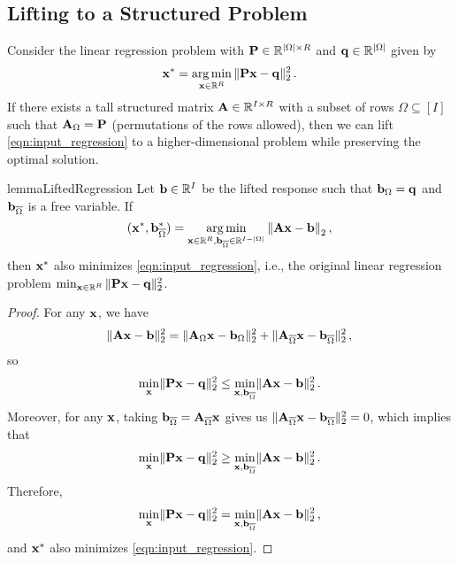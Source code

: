 \subsection{Lifting to a Structured Problem}
\label{ssec:lifting}
Consider the linear regression problem with $\mathbf{P}\in\mathbb{R}^{|\Omega| \times R}$ and $\mathbf{q} \in \mathbb{R}^{|\Omega|}$ given by
\begin{equation}
\label{eqn:input_regression}
    \mathbf{x}^* = \operatorname*{arg\,min}_{\mathbf{x} \in \mathbb{R}^R} \,\lVert\mathbf{P} \mathbf{x} - \mathbf{q}\rVert_{2}^2\,.
\end{equation}
If there exists a tall structured matrix $\mathbf{A} \in \mathbb{R}^{I \times R}$
with a subset of rows $\Omega \subseteq [I]$ such that $\mathbf{A}_{\Omega} = \mathbf{P}$
(permutations of the rows allowed),
then we can lift \eqref{eqn:input_regression} to a higher-dimensional problem while preserving the optimal solution.

\begin{restatable}[]{lemma}{LiftedRegression}
\label{lem:lifted_regression}
Let $\mathbf{b} \in \mathbb{R}^I$ be the lifted response such that $\mathbf{b}_{\Omega} = \mathbf{q}$
and $\mathbf{b}_{\overline{\Omega}}$ is a free variable. If
\begin{equation}
\label{eqn:lifted_regression}
    (\mat{x}^*, \mat{b}^*_{\overline{\Omega}})
    =
    \argmin_{\mat{x} \in \R^R, \mat{b}_{\overline{\Omega}} \in \R^{I - |\Omega|}}\, \norm*{\mat{A} \mat{x} - \mat{b}}_{2}\,,
\end{equation}
then $\mathbf{x}^*$ also minimizes \eqref{eqn:input_regression},
i.e., the original linear regression problem $\min_{\mathbf{x} \in \mathbb{R}^R}\, \lVert\mathbf{P} \mathbf{x} - \mathbf{q}\rVert_{2}^2$.
\end{restatable}

\begin{proof}
For any $\mathbf{x}$, we have
\[
    \lVert\mathbf{A}\mathbf{x}-\mathbf{b}\rVert_2^2
    =
    \lVert\mathbf{A}_{\Omega}\mathbf{x} - \mathbf{b}_{\Omega}\rVert_{2}^2
    +
    \lVert\mathbf{A}_{\overline\Omega}\mathbf{x} - \mathbf{b}_{\overline\Omega}\rVert_{2}^2\,,
\]
so
\[
\min_{\mathbf{x}}\lVert\mathbf{P} \mathbf{x} - \mathbf{q}\rVert_2^2 \leq \min_{\mathbf{x},\mathbf{b}_{\overline{\Omega}}} \lVert\mathbf{A}\mathbf{x}-\mathbf{b}\rVert_2^2\,.
\]
Moreover, for any $\mathbf{x}$, taking $\mathbf{b}_{\overline \Omega} = \mathbf{A}_{\overline \Omega}\mathbf{x}$ gives us $\lVert\mathbf{A}_{\overline\Omega}\mathbf{x} - \mathbf{b}_{\overline\Omega}\rVert_{2}^2=0$, which implies that
\[
\min_{\mathbf{x}} \lVert\mathbf{P} \mathbf{x} - \mathbf{q}\rVert_2^2 \geq \min_{\mathbf{x},\mathbf{b}_{\overline{\Omega}}} \lVert\mathbf{A}\mathbf{x}-\mathbf{b}\rVert_2^2\,.
\]
Therefore,
\[
\min_{\mathbf{x}}\lVert\mathbf{P} \mathbf{x} - \mathbf{q}\rVert_2^2 = \min_{\mathbf{x},\mathbf{b}_{\overline{\Omega}}} \lVert\mathbf{A}\mathbf{x}-\mathbf{b}\rVert_2^2\,,
\]
and $\mathbf{x}^*$ also minimizes \eqref{eqn:input_regression}.
\end{proof}

